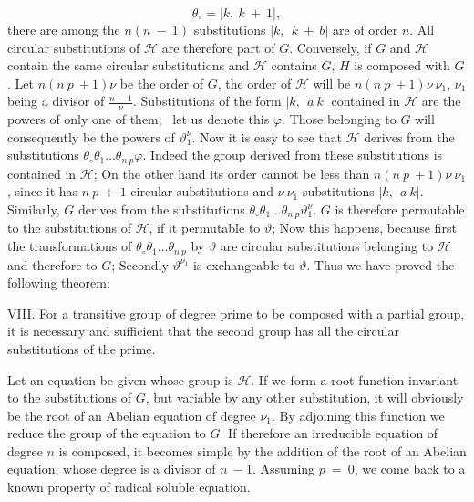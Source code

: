 \documentclass[11pt,fancy]{elegantbook}
\begin{document}
\begin{equation}
    \theta_\circ=|k , \ {k \ + \ 1}|,
\end{equation}
there are among the $n(n \ - \ 1)$ substitutions $|k, \ \ {k \ + \ b}|$ are of order $n$. All circular substitutions of $\mathcal{H}$ are therefore part of $G$.
Conversely, if $G$ and $\mathcal{H}$ contain the same circular substitutions and $\mathcal{H}$ contains $G$, $H$ is composed with $G$. Let $n(n \ p \ + 1)\nu$ be the order of $G$, the order of $\mathcal{H}$ will be $n(n \ p \ + 1)\nu \ \nu_1$, $\nu_1$ being a divisor of $\frac{n \ -1}{\nu}$. Substitutions of the form $|k, \ \ {a \ k}|$ contained in $\mathcal{H}$ are the powers of only one of them; \ let us denote this $\varphi$. Those belonging to $G$ will consequently be the powers of $\vartheta^\nu_1$. Now it is easy to see that $\mathcal{H}$ derives from the substitutions $\theta_\circ \theta_1 \dots \theta_{n \ p}\varphi$. Indeed the group derived from these substitutions is contained in $\mathcal{H}$; On the other hand its order cannot be less than $n(n \ p \ + 1)\nu \ \nu_1$, since it has $n \ p \ + \ 1$ circular substitutions and $\nu \ \nu_1$ substitutions $|k, \ \ {a \ k}|$. Similarly, $G$ derives from the substitutions $\theta_\circ \theta_1 \dots \theta_{n \ p}\vartheta^\nu_1$. $G$ is therefore permutable to the substitutions of $\mathcal{H}$, if it permutable to $\vartheta$; Now this happens, because first the transformations of $\theta_\circ \theta_1 \dots \theta_{n \ p}$ by $\vartheta$ are circular substitutions belonging to $\mathcal{H}$ and therefore to $G$; Secondly $\vartheta^{\nu_1}$ is exchangeable to $\vartheta$. 
Thus we have proved the following theorem:
\begin{theorem}
VIII. For a transitive group of degree prime to be composed with a partial group, it is necessary and sufficient that the second group has all the circular substitutions of the prime.
\end{theorem}
Let an equation be given whose group is $\mathcal{H}$. If we form a root function invariant to the substitutions of $G$, but variable by any other substitution, it will obviously be the root of an Abelian equation of degree $\nu_1$. By adjoining this function we reduce the group of the equation to $G$. 
If therefore an irreducible equation of degree $n$ is composed, it becomes simple by the addition of the root of an Abelian equation, whose degree is a divisor of $n \ -1$.
Assuming $p \ = \ 0$, we come back to a known property of radical soluble equation.
\end{document}
